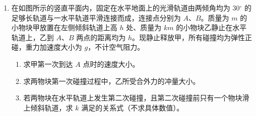 \documentclass[\gkver]{gaokaozhenti}
\begin{document}
\begin{enumerate}
{因此粒子两次在磁场中的运动轨迹关于 $y$ 轴对称，如图所示。


则粒子第二次出磁场的坐标，即为粒子第一次进入磁场的坐标 $(0, -r)$。
}


\item
在如图所示的竖直平面内，固定在水平地面上的光滑轨道由两倾角均为 $ 30 {^\circ} $ 的足够长轨道与一水平轨道平滑连接而成，连接点分别为 $ A $、$ B $。质量为 $ m $ 的小物块甲放置在左侧倾斜轨道上高 $ h $ 处、质量为 $ km $ 的小物块乙静止在水平轨道上，乙到 $ A $、$ B $ 两点的距离均为 $ h $。现静止释放甲，所有碰撞均为弹性正碰，重力加速度大小为 $ g $，不计空气阻力。
\begin{enumerate}
	\item 
	求甲第一次到达 $ A $ 点时的速度大小。
	
	\item
	求两物块第一次碰撞过程中，乙所受合外力的冲量大小。
	
	\item
	若两物块在水平轨道上发生第二次碰撞，且第二次碰撞前只有一个物块滑上倾斜轨道，求 $ k $ 满足的关系式（不求具体数值）。
\end{enumerate}
\onepicture[align=right, w=11.23cm]{}
\end{enumerate}
\end{document}
